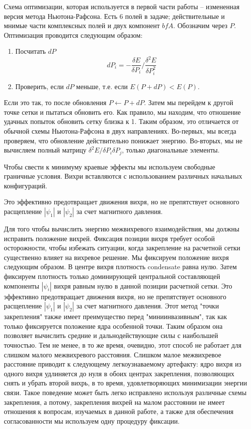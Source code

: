 Схема оптимизации, которая используется в первой части работы -- измененная 
версия метода Ньютона-Рафсона. Есть 6 полей в задаче; действительные и мнимые 
части комплексных полей и двух компонент \( bfA \). Обозначим через \( P \). 
Оптимизация проводится следующим образом:
\begin{enumerate}
    \item Посчитать \( dP \)
        \begin{equation}
            dP_i = -\frac{\delta E}{\delta P_i} \Big/
                \frac{\delta^2 E}{\delta P^2_i}
        \end{equation}
    \item Проверить, если \( dP \) меньше, т.е. если \( E(P+dP) < E(P) \).
\end{enumerate}
Если это так, то после обновления \( P \leftarrow P + dP \). Затем мы перейдем 
к другой точке сетки и пытаться обновить его. Как правило, мы находим, что 
отношение удачных попыток обновить сетку близка к 1. Таким образом, это 
отличается от обычной схемы Ньютона-Рафсона в двух направлениях. Во-первых, 
мы всегда проверяем, что обновление действительно понижает энергию. Во-вторых, 
мы не вычисляем полный матрицу \( \delta^2 E / \delta P_i \delta P_j \), только 
диагональные элементы.

Чтобы свести к минимуму краевые эффекты мы используем свободные граничные 
условия. Вихри вставляются с использованием различных начальных конфигураций.

Это эффективно предотвращает движения вихря, но не препятствует основного 
расщепление \( |\psi_1| \) и \( |\psi_2| \) за счет магнитного давления.

Для того чтобы вычислить энергию межвихревого взаимодействия, мы должны 
исправить положение вихрей. Фиксация позиции вихря требует особой осторожности, 
чтобы избежать ситуации, когда закрепление на расчетной сетки существенно 
влияет на вихревое решение. Мы фиксируем положение вихря следующим образом. 
В центре вихря плотность condensate равна нулю. Затем фиксируем плотность 
только доминирующей центральной составляющей компоненты \( |\psi_i| \) вихря 
равным нулю в данной позиции расчетной сетки. Это эффективно предотвращает 
движения вихря, но не препятствует основного расщепление \( |\psi_1| \) и 
\( |\psi_2| \) за счет магнитного давления. Этот метод "точки закрепления" 
также имеет преимущество перед "миниинвазивным", так как только фиксируется 
положение ядра особенной точки. Таким образом она позволяет вычислить 
средние и дальнодействующие силы с наибольшей точностью. Тем не менее, в то 
же время, очевидно, этот способ не работает для слишком малого межвихревого 
расстояния. Слишком малое межвихревое расстояние приводит к следующему 
легкоузнаваемому артефакту: ядро вихря из одного вихря удлиняется до нуля в 
обоих центрах закрепления, позволяющих снять и убрать второй вихрь, в то 
время, удовлетворяющих минимизации энергии связи. Такое поведение может быть 
легко исправлено используя различные схемы закрепления, а потому, закрепления 
вихрей на малом расстоянии не имеет отношения к вопросам, изучаемых в данной 
работе, а также для обеспечения согласованности мы используем одну процедуру 
фиксации.

